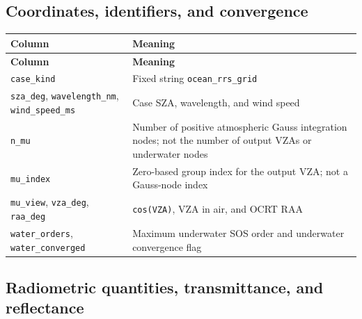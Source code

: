\subsection{Coordinates, identifiers, and convergence}
\label{sec:auto:05_output_formats:7.1}

{\TableFont
\begin{longtable}{@{}>{\raggedright\arraybackslash}p{}>{\raggedright\arraybackslash}p{}@{}}
\toprule
\textbf{Column} & \textbf{Meaning} \\
\midrule
\endfirsthead
\toprule
\textbf{Column} & \textbf{Meaning} \\
\midrule
\endhead
\bottomrule
\endfoot
\texttt{case\_\allowbreak{}kind} & Fixed string \texttt{ocean\_\allowbreak{}rrs\_\allowbreak{}grid} \\
\texttt{sza\_\allowbreak{}deg}, \texttt{wavelength\_\allowbreak{}nm}, \texttt{wind\_\allowbreak{}speed\_\allowbreak{}ms} & Case SZA, wavelength, and wind speed \\
\texttt{n\_\allowbreak{}mu} & Number of positive atmospheric Gauss integration nodes; not the number of output VZAs or underwater nodes \\
\texttt{mu\_\allowbreak{}index} & Zero-based group index for the output VZA; not a Gauss-node index \\
\texttt{mu\_\allowbreak{}view}, \texttt{vza\_\allowbreak{}deg}, \texttt{raa\_\allowbreak{}deg} & \texttt{cos(VZA)}, VZA in air, and OCRT RAA \\
\texttt{water\_\allowbreak{}orders}, \texttt{water\_\allowbreak{}converged} & Maximum underwater SOS order and underwater convergence flag \\
\end{longtable}
}

\subsection{Radiometric quantities, transmittance, and reflectance}
\label{sec:auto:05_output_formats:7.2}

